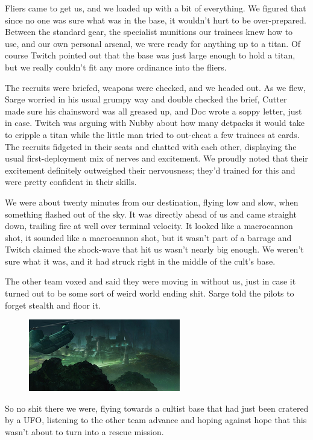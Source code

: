 Fliers came to get us, and we loaded up with a bit of everything. 
We figured that since no one was sure what was in the base, it wouldn’t hurt to be over-prepared. 
Between the standard gear, the specialist munitions our trainees knew how to use, and our own personal arsenal, we were ready for anything up to a titan. 
Of course Twitch pointed out that the base was just large enough to hold a titan, but we really couldn’t fit any more ordinance into the fliers.

The recruits were briefed, weapons were checked, and we headed out. 
As we flew, Sarge worried in his usual grumpy way and double checked the brief, Cutter made sure his chainsword was all greased up, and Doc wrote a soppy letter, just in case. 
Twitch was arguing with Nubby about how many detpacks it would take to cripple a titan while the little man tried to out-cheat a few trainees at cards. 
The recruits fidgeted in their seats and chatted with each other, displaying the usual first-deployment mix of nerves and excitement. 
We proudly noted that their excitement definitely outweighed their nervousness; 
they’d trained for this and were pretty confident in their skills.

We were about twenty minutes from our destination, flying low and slow, when something flashed out of the sky. 
It was directly ahead of us and came straight down, trailing fire at well over terminal velocity. 
It looked like a macrocannon shot, it sounded like a macrocannon shot, but it wasn’t part of a barrage and Twitch claimed the shock-wave that hit us wasn’t nearly big enough. 
We weren’t sure what it was, and it had struck right in the middle of the cult’s base.

The other team voxed and said they were moving in without us, just in case it turned out to be some sort of weird world ending shit. 
Sarge told the pilots to forget stealth and floor it.

\begin{figure}
	\begin{center}
		\includegraphics[width=\figwidth]{pics/8/37.png}
	\end{center}
\end{figure}
So no shit there we were, flying towards a cultist base that had just been cratered by a UFO, listening to the other team advance and hoping against hope that this wasn’t about to turn into a rescue mission. 


